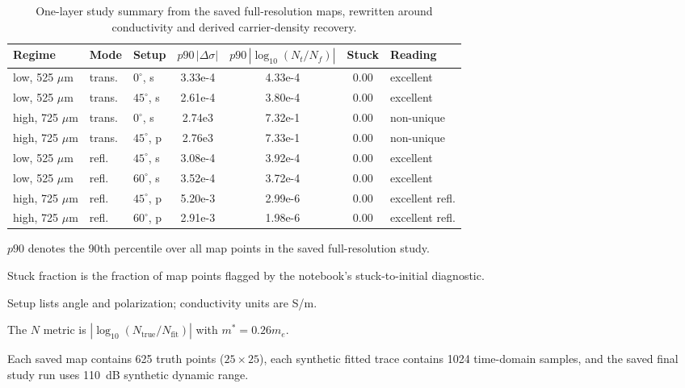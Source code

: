 \documentclass[11pt]{article}
\newcommand{\mstar}{m^\ast}
\begin{document}
\begin{table}[htbp]
\centering
\begin{threeparttable}
\caption{One-layer study summary from the saved full-resolution maps, rewritten around conductivity and derived carrier-density recovery.}
\label{tab:one-layer-study-summary-results}
\scriptsize
\begin{tabularx}{\linewidth}{@{}p{2.0cm}p{1.1cm}p{1.4cm}S[table-format=1.2e1]S[table-format=1.2e1]S[table-format=1.2]Y@{}}
\toprule
Regime & Mode & Setup & {$p90\,|\Delta\sigma|$} & {$p90\,|\log_{10}(N_t/N_f)|$} & {Stuck} & Reading \\
\midrule
low, 525 \(\mu\)m & trans. & \(0^\circ\), s & 3.33e-4 & 4.33e-4 & 0.00 & excellent \\
low, 525 \(\mu\)m & trans. & \(45^\circ\), s & 2.61e-4 & 3.80e-4 & 0.00 & excellent \\
high, 725 \(\mu\)m & trans. & \(0^\circ\), s & 2.74e3 & 7.32e-1 & 0.00 & non-unique \\
high, 725 \(\mu\)m & trans. & \(45^\circ\), p & 2.76e3 & 7.33e-1 & 0.00 & non-unique \\
low, 525 \(\mu\)m & refl. & \(45^\circ\), s & 3.08e-4 & 3.92e-4 & 0.00 & excellent \\
low, 525 \(\mu\)m & refl. & \(60^\circ\), s & 3.52e-4 & 3.72e-4 & 0.00 & excellent \\
high, 725 \(\mu\)m & refl. & \(45^\circ\), p & 5.20e-3 & 2.99e-6 & 0.00 & excellent refl. \\
high, 725 \(\mu\)m & refl. & \(60^\circ\), p & 2.91e-3 & 1.98e-6 & 0.00 & excellent refl. \\
\bottomrule
\end{tabularx}
\begin{tablenotes}[flushleft]
\footnotesize
\item \(p90\) denotes the 90th percentile over all map points in the saved full-resolution study.
\item Stuck fraction is the fraction of map points flagged by the notebook's stuck-to-initial diagnostic.
\item Setup lists angle and polarization; conductivity units are S/m.
\item The \(N\) metric is \( |\log_{10}(N_{\mathrm{true}}/N_{\mathrm{fit}})| \) with \( \mstar = 0.26m_e \).
\item Each saved map contains 625 truth points (\(25\times25\)), each synthetic fitted trace contains 1024 time-domain samples, and the saved final study run uses \SI{110}{dB} synthetic dynamic range.
\end{tablenotes}
\end{threeparttable}
\end{table}
\end{document}
